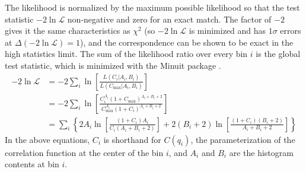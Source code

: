 The likelihood is normalized by the maximum possible likelihood so that the test statistic $-2\ln \mathcal{L}$ non-negative and zero for an exact match.
The factor of $-2$ gives it the same characteristics as $\chi^2$ (so $-2\ln\mathcal{L}$ is minimized and has $1\sigma$ errors at $\Delta (-2\ln\mathcal{L}) = 1$), and the correspondence can be shown to be exact in the high statistics limit.
The sum of the likelihood ratio over every bin $i$ is the global test statistic, which is minimized with the Minuit package \cite{James:1975dr}.
\begin{align}
-2\ln \mathcal{L} &= -2 \sum_i \ln \left[ \frac{L(C_i|A_i,B_i)}{L(C_{\textrm{max}}|A_i,B_i)} \right]\\
&= -2 \sum_i \ln \left[ \frac{C_i^{A_i} (1+C_{\textrm{max}})^{A_i+B_i+2}}{C_{\textrm{max}}^{A_i} (1+C_i)^{A_i+B_i+2}} \right]\\
&= \sum_i \left\{ 2 A_i \ln \left[\frac{(1+C_i)A_i}{C_i (A_i+B_i+2)} \right] + 2(B_i+2) \ln \left[ \frac{(1+C_i)(B_i+2)}{A_i+B_i+2} \right] \right\}
\end{align}
In the above equations, $C_i$ is shorthand for $C(q_i)$, the parameterization of the correlation function at the center of the bin $i$, and $A_i$ and $B_i$ are the histogram contents at bin $i$.

